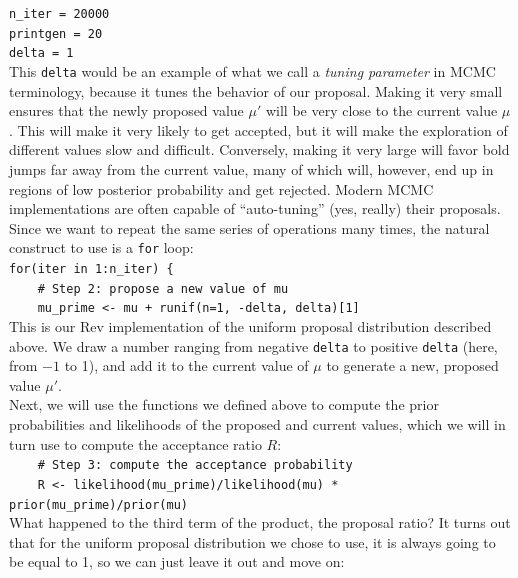 \documentclass[12pt]{article}
\begin{document}
\indent \texttt{n\_iter = 20000} \\
\indent \texttt{printgen = 20} \\
\indent \texttt{delta = 1} \\

\noindent This \texttt{delta} would be an example of what we call a \textit{tuning parameter} in MCMC terminology, because it tunes the behavior of our proposal. Making it very small ensures that the newly proposed value $\mu'$ will be very close to the current value $\mu$. This will make it very likely to get accepted, but it will make the exploration of different values slow and difficult. Conversely, making it very large will favor bold jumps far away from the current value, many of which will, however, end up in regions of low posterior probability and get rejected. Modern MCMC implementations are often capable of ``auto-tuning'' (yes, really) their proposals. \\

\noindent Since we want to repeat the same series of operations many times, the natural construct to use is a \texttt{for} loop: \\

\indent \texttt{for(iter in 1:n\_iter) \{} \\
\indent \texttt{\ \ \ \ \# Step 2: propose a new value of mu} \\
\indent \texttt{\ \ \ \ mu\_prime <- mu + runif(n=1, -delta, delta)[1]} \\

\noindent This is our Rev implementation of the uniform proposal distribution described above. We draw a number ranging from negative \texttt{delta} to positive \texttt{delta} (here, from $-1$ to 1), and add it to the current value of $\mu$ to generate a new, proposed value $\mu'$. \\

\noindent Next, we will use the functions we defined above to compute the prior probabilities and likelihoods of the proposed and current values, which we will in turn use to compute the acceptance ratio $R$: \\

\indent \texttt{\ \ \ \ \# Step 3: compute the acceptance probability} \\
\indent \texttt{\ \ \ \ R <- likelihood(mu\_prime)/likelihood(mu) * prior(mu\_prime)/prior(mu)} \\

\noindent What happened to the third term of the product, the proposal ratio? It turns out that for the uniform proposal distribution we chose to use, it is always going to be equal to 1, so we can just leave it out and move on: \\
\end{document}
